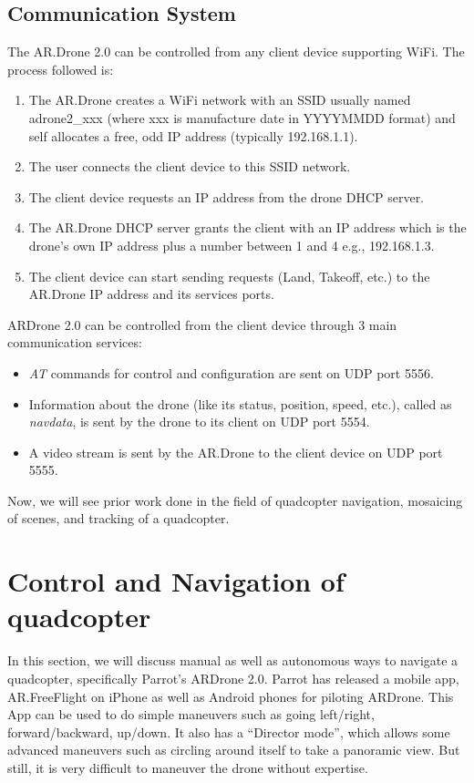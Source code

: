 \subsection{Communication System}
The AR.Drone 2.0 can be controlled from any client device supporting WiFi. The 
process followed is:
\begin{enumerate}
  \item The AR.Drone creates a WiFi network with an SSID usually named
adrone2\_xxx (where xxx is manufacture date in YYYYMMDD format) and self
allocates a free, odd IP address (typically 192.168.1.1).

   \item The user connects the client device to this SSID network.
   \item The client device requests an IP address from the drone DHCP server.
   \item The AR.Drone DHCP server grants the client with an IP address which is
   the drone's own IP address plus a number between 1 and 4 e.g., 192.168.1.3.
   \item The client device can start sending requests (Land, Takeoff, etc.) to
   the AR.Drone IP address and its services ports.
\end{enumerate}

ARDrone 2.0 can be controlled from the client device through 3 main communication
services: 
\begin{itemize}
\item \textit{AT} commands for control and configuration are sent on UDP
port 5556.
\item Information about the drone (like its status, position,  speed, 
etc.), called as \textit{navdata}, is sent by the drone to its client on UDP
port 5554.  
\item A video stream is sent by the AR.Drone to the client device on UDP port
5555.
\end{itemize}

Now, we will see prior work done in the field of quadcopter navigation,
mosaicing of scenes, and tracking of a quadcopter.

\section{Control and Navigation of quadcopter}
In this section, we will discuss manual as well as autonomous ways to navigate
a quadcopter, specifically Parrot's ARDrone 2.0.
Parrot has released a mobile app, AR.FreeFlight on iPhone as well as Android
phones for piloting ARDrone. This App can be used to do simple maneuvers such
as going left/right, forward/backward, up/down. It also has a ``Director mode'',
which allows some advanced maneuvers such as circling around itself to take
a panoramic view. But still, it is very difficult to maneuver the drone without
expertise.


